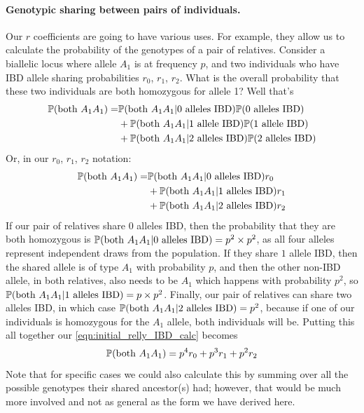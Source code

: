 {{\paragraph{Genotypic sharing between pairs of individuals.}
Our $r$ coefficients are going to have various uses. For example, they allow us
to calculate the probability of the genotypes of a pair of
relatives. Consider a biallelic locus where allele $A_1$ is
at frequency $p$, and two individuals who have IBD allele sharing
probabilities $r_0$, $r_1$, $r_2$. What is the overall probability that these
two individuals are both homozygous for allele 1? Well that's
\begin{align}
  \P(\textrm{both } A_1 A_1) = & \P(\textrm{both } A_1 A_1 | \text{0 alleles IBD}) \P(\text{0 alleles IBD})  \nonumber\\
  & + \P(\textrm{both } A_1 A_1 | \text{1 allele IBD}) \P(\text{1 allele IBD})  \nonumber\\
  &+ \P(\textrm{both } A_1 A_1 | \text{2 alleles IBD}) \P(\text{2 alleles IBD})
\end{align}
Or, in our $r_0$, $r_1$, $r_2$ notation:
\begin{align}
  \P(\textrm{both } A_1 A_1) = & \P(\textrm{both } A_1 A_1 | \text{0 alleles IBD}) r_0  \nonumber\\
  & + \P(\textrm{both } A_1 A_1 |
  \text{1 alleles IBD}) r_1  \nonumber\\
  & + \P(\textrm{both } A_1 A_1 | \text{2 alleles IBD}) r_2 \label{eqn:initial_relly_IBD_calc}
\end{align}
If our pair of relatives share $0$ alleles IBD, then the probability that
they are both homozygous is $\P(\textrm{both } A_1 A_1 |
\text{0 alleles IBD}) =p^2 \times p^2$, as all four alleles
represent independent draws from the population. If they share $1$
allele IBD, then the shared allele is of type $A_1$ with probability $p$, and then
the other non-IBD allele, in both relatives, also needs
to be $A_1$ which happens with probability $p^2$, so $\P(\textrm{both } A_1 A_1 |
\text{1 alleles IBD})=p \times p^2$. Finally, our pair of relatives can
share two alleles IBD, in which case $\P(\textrm{both } A_1 A_1 | \text{2 alleles IBD})
= p^2$, because if one of our individuals is homozygous for the $A_1$ allele,
both individuals will be. Putting this all together our \eqn
\eqref{eqn:initial_relly_IBD_calc} becomes
\begin{equation}
\P(\textrm{both } A_1 A_1) = p^4 r_0 + p^3 r_1 + p^2 r_2 \label{eqn:IBD_relly_calc}
\end{equation}
Note that for specific cases we could also calculate this by summing over all the
possible genotypes their shared ancestor(s) had; however, that would be much more
involved and not as general as the form we have derived here.

}}
